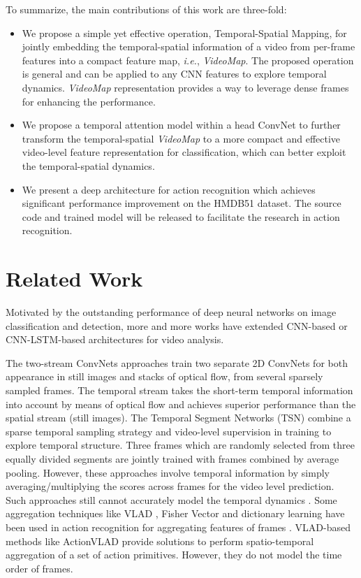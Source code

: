 \documentclass[english, 10pt, twocolumn, twoside]{IEEEtran}
\begin{document}
To summarize, the main contributions of this work are three-fold:
\begin{itemize}
\item We propose a simple yet effective operation, Temporal-Spatial Mapping, for jointly embedding the temporal-spatial information of a video from per-frame features into a compact feature map, \emph{i.e.}, \emph{VideoMap}. The proposed operation is general and can be applied to any CNN features to explore temporal dynamics. \emph{VideoMap} representation provides a way to leverage dense frames for enhancing the performance.\item We propose a temporal attention model within a head ConvNet to further transform the temporal-spatial \emph{VideoMap} to a more compact and effective video-level feature representation for classification, which can better exploit the temporal-spatial dynamics.
\item We present a deep architecture for action recognition which achieves significant performance improvement on the HMDB51 dataset. The source code and trained model will be released to facilitate the research in action recognition.
\end{itemize}

\section{Related Work}
\label{secRelWork}
Motivated by the outstanding performance of deep neural networks on image classification and detection, more and more works have extended CNN-based or CNN-LSTM-based architectures for video analysis.

The two-stream ConvNets approaches \cite{simonyan2014two,wang2016temporal} train two separate 2D ConvNets for both appearance in still images and stacks of optical flow, from several sparsely sampled frames. The temporal stream takes the short-term temporal information into account by means of optical flow and achieves superior performance than the spatial stream (still images). The Temporal Segment Networks (TSN) \cite{wang2016temporal} combine a sparse temporal sampling strategy and video-level supervision in training to explore temporal structure. Three frames which are randomly selected from three equally divided segments are jointly trained with frames combined by average pooling. However, these approaches involve temporal information by simply averaging/multiplying the scores across frames for the video level prediction. Such approaches still cannot accurately model the temporal dynamics \cite{simonyan2014two,wang2016temporal,diba2016deep}. Some aggregation techniques like VLAD \cite{Jegou2012Aggregating}, Fisher Vector \cite{Nchez2013Image} and dictionary learning \cite{xu2017two-stream} have been used in action recognition for aggregating features of frames  \cite{Girdhar2017ActionVLAD,xu2015discriminative,peng2014action}. VLAD-based methods like ActionVLAD \cite{Girdhar2017ActionVLAD} provide solutions to perform spatio-temporal aggregation of a set of action primitives. However, they do not model the time order of frames.
\end{document}
